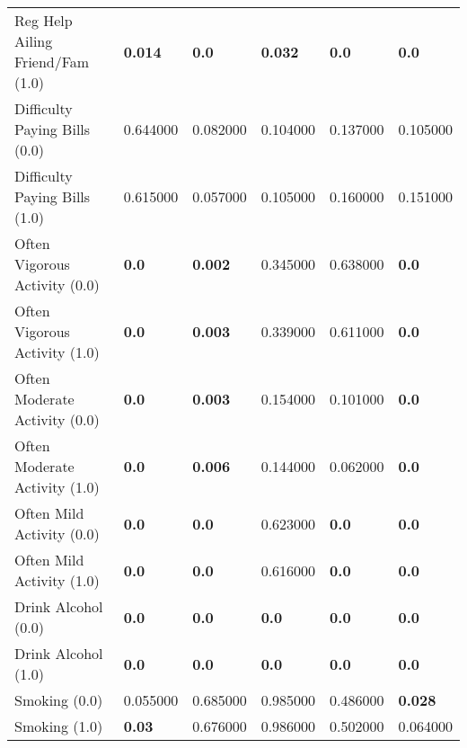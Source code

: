 \begin{tabular}{llllll}
Reg Help Ailing Friend/Fam (1.0) & \textbf{0.014} & \textbf{0.0} & \textbf{0.032} & \textbf{0.0} & \textbf{0.0} \\
Difficulty Paying Bills (0.0) & 0.644000 & 0.082000 & 0.104000 & 0.137000 & 0.105000 \\
Difficulty Paying Bills (1.0) & 0.615000 & 0.057000 & 0.105000 & 0.160000 & 0.151000 \\
Often Vigorous Activity (0.0) & \textbf{0.0} & \textbf{0.002} & 0.345000 & 0.638000 & \textbf{0.0} \\
Often Vigorous Activity (1.0) & \textbf{0.0} & \textbf{0.003} & 0.339000 & 0.611000 & \textbf{0.0} \\
Often Moderate Activity (0.0) & \textbf{0.0} & \textbf{0.003} & 0.154000 & 0.101000 & \textbf{0.0} \\
Often Moderate Activity (1.0) & \textbf{0.0} & \textbf{0.006} & 0.144000 & 0.062000 & \textbf{0.0} \\
Often Mild Activity (0.0) & \textbf{0.0} & \textbf{0.0} & 0.623000 & \textbf{0.0} & \textbf{0.0} \\
Often Mild Activity (1.0) & \textbf{0.0} & \textbf{0.0} & 0.616000 & \textbf{0.0} & \textbf{0.0} \\
Drink Alcohol (0.0) & \textbf{0.0} & \textbf{0.0} & \textbf{0.0} & \textbf{0.0} & \textbf{0.0} \\
Drink Alcohol (1.0) & \textbf{0.0} & \textbf{0.0} & \textbf{0.0} & \textbf{0.0} & \textbf{0.0} \\
Smoking (0.0) & 0.055000 & 0.685000 & 0.985000 & 0.486000 & \textbf{0.028} \\
Smoking (1.0) & \textbf{0.03} & 0.676000 & 0.986000 & 0.502000 & 0.064000 \\
\bottomrule
\end{tabular}
